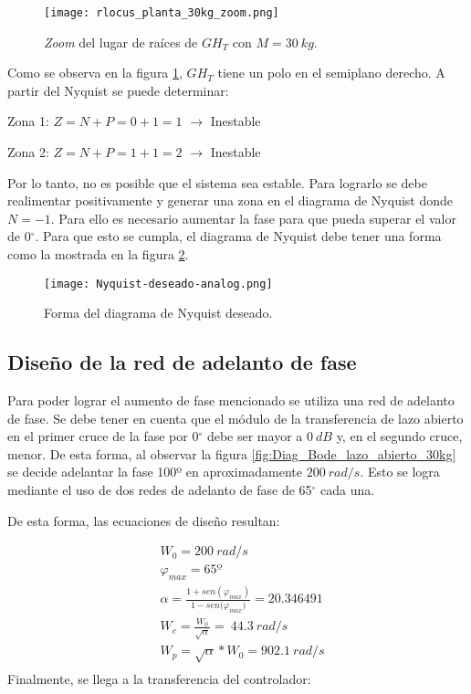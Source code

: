 \begin{figure}[H]
	\centering
	\texttt{[image: rlocus\_planta\_30kg\_zoom.png]}
	\caption{\textsl{Zoom} del lugar de raíces de $GH_T$ con $M=30\:kg$.}
	\label{fig:rlocus_m30kg_zoom}
\end{figure}

\noindent Como se observa en la figura \ref{fig:rlocus_m30kg_zoom}, $GH_{T}$ tiene un polo en el semiplano derecho. A partir del Nyquist se puede determinar:

\noindent Zona 1: $Z=N+P=0+1=1$ $\mathrm{\to}$ Inestable 

\noindent Zona 2: $Z=N+P=1+1=2$ $\mathrm{\to}$ Inestable

\noindent Por lo tanto, no es posible que el sistema sea estable. Para lograrlo se debe realimentar positivamente y generar una zona en el diagrama de Nyquist donde $N=-1$. Para ello es necesario aumentar la fase para que pueda superar el valor de 0$\mathrm{{}^\circ}$.  Para que esto se cumpla, el diagrama de Nyquist debe tener una forma como la  mostrada en la figura \ref{fig:nyquist-deseado-analog}.

\begin{figure}[H]
	\centering
	\texttt{[image: Nyquist-deseado-analog.png]}
	\caption{Forma del diagrama de Nyquist deseado.}
	\label{fig:nyquist-deseado-analog}
\end{figure}

\subsection{Diseño de la red de adelanto de fase}

\noindent Para poder lograr el aumento de fase mencionado se utiliza una red de adelanto de fase. Se debe tener en cuenta que el m\'{o}dulo de la transferencia de lazo abierto en el primer cruce de la fase por 0$\mathrm{{}^\circ}$ debe ser mayor a $0\:dB$ y, en el segundo cruce, menor. De esta forma, al observar la figura \ref{fig:Diag_Bode_lazo_abierto_30kg} se decide adelantar la fase 100º en aproximadamente $200\:rad/s$. Esto se logra mediante el uso de dos redes de adelanto de fase de 65$\mathrm{{}^\circ}$ cada una.

\noindent De esta forma, las ecuaciones de dise\~{n}o resultan:

\begin{equation*}
	\begin{aligned}
		&W_0 =200\:rad/s\\
		&{\varphi }_{max} =65\textrm{º}\\
		&\alpha =\frac{1+sen({\varphi }_{max})}{1-sen{(\varphi }_{max})}=20.346491\\
		&W_c =\frac{W_0}{\sqrt{\alpha }}=\ 44.3\:rad/s\\
		&W_p =\sqrt{\alpha }*W_0=902.1\: rad/s\\
	\end{aligned}
\end{equation*} 
\noindent Finalmente, se llega a la transferencia del controlador:

